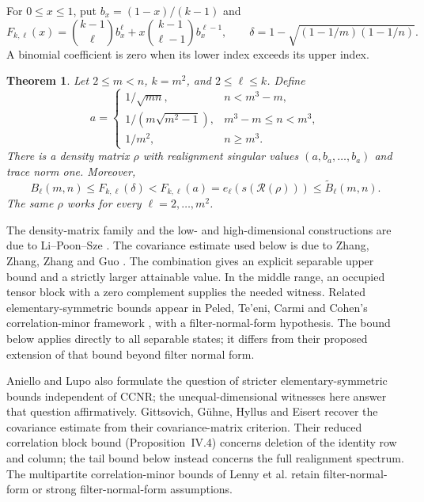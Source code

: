 \documentclass[11pt]{article}
\newtheorem{theorem}{Theorem}
\newcommand{\R}{\mathcal R}
\newcommand{\e}{e}
\newcommand{\F}{F_{k,\ell}}
\begin{document}
For $0\le x\le1$, put $b_x=(1-x)/(k-1)$ and
\begin{equation}\label{profile}
 \F(x)=\binom{k-1}{\ell}b_x^\ell+
 x\binom{k-1}{\ell-1}b_x^{\ell-1},\qquad
 \delta=1-\sqrt{(1-1/m)(1-1/n)}.
\end{equation}
A binomial coefficient is zero when its lower index exceeds its upper
index.

\begin{theorem}\label{main}
Let $2\le m<n$, $k=m^2$, and $2\le\ell\le k$. Define
\begin{equation}\label{choose-a}
 a=\begin{cases}
 1/\sqrt{mn},&n<m^3-m,\\
 1/(m\sqrt{m^2-1}),&m^3-m\le n<m^3,\\
 1/m^2,&n\ge m^3.
 \end{cases}
\end{equation}
There is a density matrix $\rho$ with realignment singular values
$(a,b_a,\ldots,b_a)$ and trace norm one. Moreover,
\begin{equation}\label{gap}
 B_\ell(m,n)\le\F(\delta)<\F(a)
 =\e_\ell(s(\R(\rho)))\le\widetilde B_\ell(m,n).
\end{equation}
The same $\rho$ works for every $\ell=2,\ldots,m^2$.
\end{theorem}

The density-matrix family and the low- and high-dimensional constructions
are due to Li--Poon--Sze \cite[proof of Theorem~2.3]{LPS}. The covariance
estimate used below is due to Zhang, Zhang, Zhang and Guo
\cite[Theorem~1]{ZZZG}. The combination gives an explicit separable
upper bound and a strictly larger attainable value. In the middle range,
an occupied tensor block with a zero complement supplies the needed witness.
Related elementary-symmetric bounds appear in Peled, Te'eni, Carmi and
Cohen's correlation-minor framework \cite[Theorem~1]{PTCC}, with a
filter-normal-form hypothesis. The bound below applies directly to all
separable states; it differs from their proposed extension of that bound
beyond filter normal form.

Aniello and Lupo \cite[Section~4, pp.~6--8]{AL} also formulate the
question of stricter elementary-symmetric bounds independent of CCNR;
the unequal-dimensional witnesses here answer that question affirmatively.
Gittsovich, G\"uhne, Hyllus and Eisert
\cite[Proposition~IV.2 and Remark~IV.3]{GGHE} recover the covariance
estimate from their covariance-matrix criterion. Their reduced correlation
block bound (Proposition~IV.4) concerns deletion of the identity row and
column; the tail bound below instead concerns the full realignment spectrum.
The multipartite correlation-minor bounds of Lenny et al.
\cite[Theorems~1--4]{LTPCC} retain filter-normal-form or strong
filter-normal-form assumptions.
\end{document}
